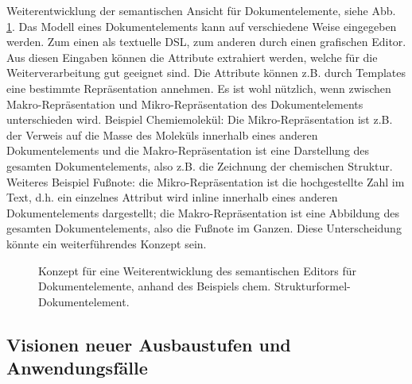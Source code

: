  
Weiterentwicklung der semantischen Ansicht für Dokumentelemente, siehe Abb. \ref{semanticeditor}. Das Modell eines Dokumentelements kann auf verschiedene Weise eingegeben werden. Zum einen als textuelle DSL, zum anderen durch einen grafischen Editor. Aus diesen Eingaben können die Attribute extrahiert werden, welche für die Weiterverarbeitung gut geeignet sind. Die Attribute können z.B. durch Templates eine bestimmte Repräsentation annehmen. Es ist wohl nützlich, wenn zwischen Makro-Repräsentation und Mikro-Repräsentation des Dokumentelements unterschieden wird. Beispiel Chemiemolekül: Die Mikro-Repräsentation ist z.B. der Verweis auf die Masse des Moleküls innerhalb eines anderen Dokumentelements und die Makro-Repräsentation ist eine Darstellung des gesamten Dokumentelements, also z.B. die Zeichnung der chemischen Struktur. Weiteres Beispiel Fußnote: die Mikro-Repräsentation ist die hochgestellte Zahl im Text, d.h. ein einzelnes Attribut wird inline innerhalb eines anderen Dokumentelements dargestellt; die Makro-Repräsentation ist eine Abbildung des gesamten Dokumentelements, also die Fußnote im Ganzen. Diese Unterscheidung könnte ein weiterführendes Konzept sein.

 
\begin{figure}[h!]
\centering
{}
\caption[Weiterentwicklung der Dokumentelement Editoransicht]{ Konzept für eine Weiterentwicklung des semantischen Editors für Dokumentelemente, anhand des Beispiels chem. Strukturformel-Dokumentelement. }\label{semanticeditor}
\end{figure}
 
\subsection{Visionen neuer Ausbaustufen und Anwendungsfälle}\label{}
 
